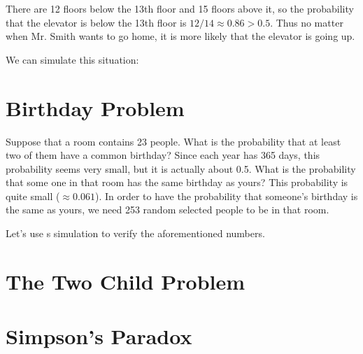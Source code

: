 There are 12 floors below the 13th floor and 15 floors above it, so the probability that the elevator is below the 13th floor is $12/14\approx0.86>0.5$. Thus no matter when Mr. Smith wants to go home, it is more likely that the elevator is going up.

We can simulate this situation:




\hypertarget{birthday-problem}{%
  \section{Birthday Problem}\label{birthday-problem}}

Suppose that a room contains 23 people. What is the probability that
at least two of them have a common birthday? Since each year has 365
days, this probability seems very small, but it is actually about
0.5. What is the probability that some one in that room has the same
birthday as yours? This probability is quite small
($\approx0.061$). In order to have the probability that someone's
birthday is the same as yours, we need 253 random selected people to
be in that room.

Let's use s simulation to verify the aforementioned numbers.



\hypertarget{the-two-child-problem}{%
\section{The Two Child Problem}\label{the-two-child-problem}}


\hypertarget{simpsons-paradox}{%
\section{Simpson's Paradox}\label{simpsons-paradox}}

